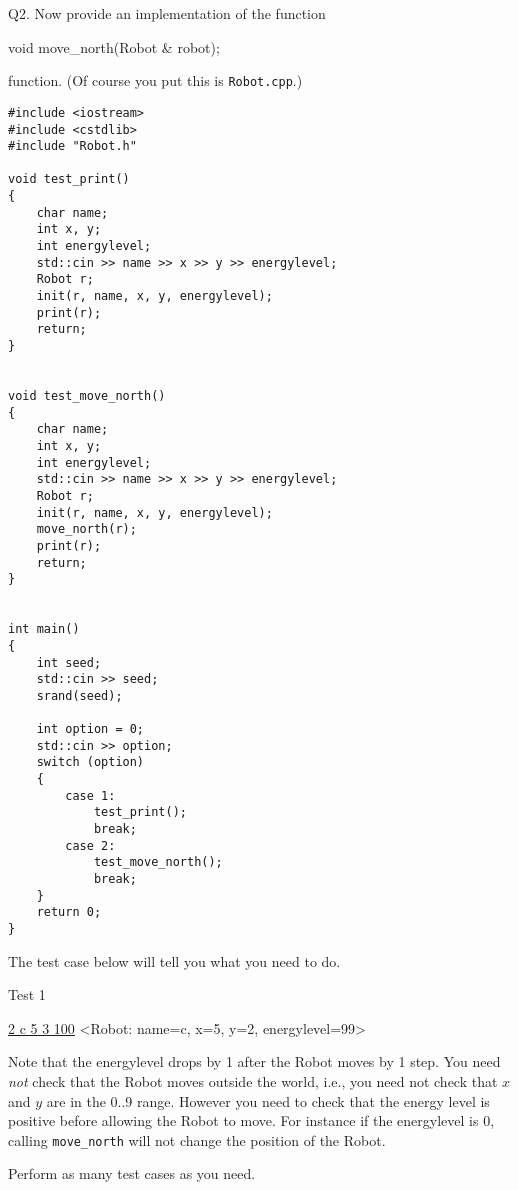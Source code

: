 Q2.
Now provide an implementation of the function
{\small
\begin{console}
void move_north(Robot & robot);
\end{console}
}
function.
(Of course you put this is \verb!Robot.cpp!.)

{\small
\begin{Verbatim}[frame=single]
#include <iostream>
#include <cstdlib>
#include "Robot.h"

void test_print()
{
    char name;
    int x, y;
    int energylevel;
    std::cin >> name >> x >> y >> energylevel;
    Robot r;
    init(r, name, x, y, energylevel);
    print(r);
    return;
}


void test_move_north()
{
    char name;
    int x, y;
    int energylevel;
    std::cin >> name >> x >> y >> energylevel;
    Robot r;
    init(r, name, x, y, energylevel);
    move_north(r);
    print(r);
    return;
}


int main()
{
    int seed;
    std::cin >> seed;
    srand(seed);
    
    int option = 0;
    std::cin >> option;
    switch (option)
    {
        case 1:
            test_print();
            break;         
        case 2:
            test_move_north();
            break;
    }
    return 0;
}      
\end{Verbatim}
}

The test case below will tell you what you need to do.

Test 1
\begin{console}[commandchars=\\\{\}]
\underline{2 c 5 3 100}
<Robot: name=c, x=5, y=2, energylevel=99>
\end{console}
Note that the energylevel drops by 1 after the Robot moves by 1 step.
You need \textit{not} check that the Robot moves outside the world, i.e.,
you need not check that $x$ and $y$ are in the 0..9 range.
However you need to check that the energy level is positive
before allowing the Robot to move.
For instance if the energylevel is 0, calling \verb!move_north!
will not change the position of the Robot.

Perform as many test cases as you need.


